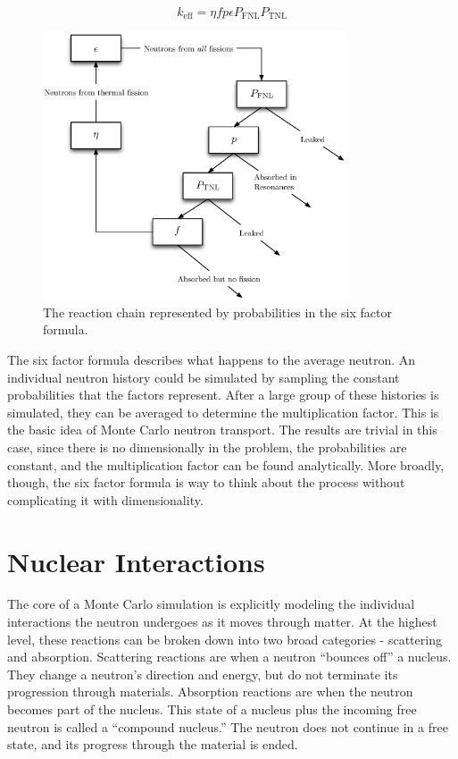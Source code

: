 \begin{equation}
\label{six_ff_eq}
k_\mathrm{eff}  = \eta f p  \epsilon P_\mathrm{FNL} P_\mathrm{TNL}
\end{equation}


\begin{figure}[h!]
  \centering
    \includegraphics[width=0.8\textwidth]{graphics/six_ff.eps}
     \caption{The reaction chain represented by probabilities in the six factor formula. \label{six_ff_chain}}
\end{figure}

The six factor formula describes what happens to the average neutron. An individual neutron history could be simulated by sampling the constant probabilities that the factors represent.  After a large group of these histories is simulated, they can be averaged to determine the multiplication factor.  This is the basic idea of Monte Carlo neutron transport.  The results are trivial in this case, since there is no dimensionally in the problem, the probabilities are constant, and the multiplication factor can be found analytically.  More broadly, though, the six factor formula is way to think about the process without complicating it with dimensionality.


\section{Nuclear Interactions}
\label{subsec:interactions}

The core of a Monte Carlo simulation is explicitly modeling the individual interactions the neutron undergoes as it moves through matter.  At the highest level, these reactions can be broken down into two broad categories - scattering and absorption.  Scattering reactions are when a neutron ``bounces off'' a nucleus.  They change a neutron's direction and energy, but do not terminate its progression through materials.  Absorption reactions are when the neutron becomes part of the nucleus.  This state of a nucleus plus the incoming free neutron is called a ``compound nucleus.''  The neutron does not continue in a free state, and its progress through the material is ended.

